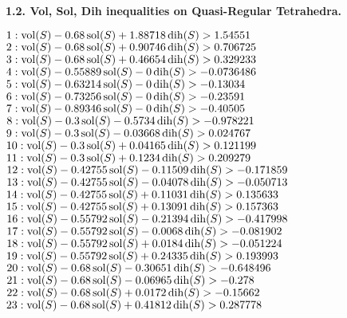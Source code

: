 \smallskip

{\bf 1.2. Vol, Sol, Dih inequalities on Quasi-Regular Tetrahedra.}

\smallskip

$1:  \vol(S) - 0.68 \sol(S) + 1.88718 \dih(S) > 1.54551 $\newline
$2:  \vol(S) - 0.68 \sol(S) + 0.90746 \dih(S) > 0.706725$\newline
$3:  \vol(S) - 0.68 \sol(S) + 0.46654 \dih(S) > 0.329233$\newline
$4:  \vol(S) - 0.55889 \sol(S) - 0 \dih(S) > -0.0736486$\newline
$5:  \vol(S) - 0.63214 \sol(S) - 0 \dih(S) > -0.13034$\newline
$6:  \vol(S) - 0.73256 \sol(S) - 0 \dih(S) > -0.23591$\newline
$7:  \vol(S) - 0.89346 \sol(S) - 0 \dih(S) > -0.40505$\newline
$8:  \vol(S) - 0.3 \sol(S) - 0.5734 \dih(S) > -0.978221$\newline
$9:  \vol(S) - 0.3 \sol(S) - 0.03668 \dih(S) > 0.024767$\newline
$10:  \vol(S) - 0.3 \sol(S) + 0.04165 \dih(S) > 0.121199$\newline
$11:  \vol(S) - 0.3 \sol(S) + 0.1234 \dih(S) > 0.209279$\newline
$12:  \vol(S) - 0.42755 \sol(S) - 0.11509 \dih(S) > -0.171859$\newline
$13:  \vol(S) - 0.42755 \sol(S) - 0.04078 \dih(S) > -0.050713$\newline
$14:  \vol(S) - 0.42755 \sol(S) + 0.11031 \dih(S) > 0.135633$\newline
$15:  \vol(S) - 0.42755 \sol(S) + 0.13091 \dih(S) > 0.157363$\newline
$16:  \vol(S) - 0.55792 \sol(S) - 0.21394 \dih(S) > -0.417998$\newline
$17:  \vol(S) - 0.55792 \sol(S) - 0.0068 \dih(S) > -0.081902$\newline
$18:  \vol(S) - 0.55792 \sol(S) + 0.0184 \dih(S) > -0.051224$\newline
$19:  \vol(S) - 0.55792 \sol(S) + 0.24335 \dih(S) > 0.193993$\newline
$20:  \vol(S) - 0.68 \sol(S) - 0.30651 \dih(S) > -0.648496$\newline
$21:  \vol(S) - 0.68 \sol(S) - 0.06965 \dih(S) > -0.278$\newline
$22:  \vol(S) - 0.68 \sol(S) + 0.0172 \dih(S) > -0.15662$\newline
$23:  \vol(S) - 0.68 \sol(S) + 0.41812 \dih(S) > 0.287778$\newline
